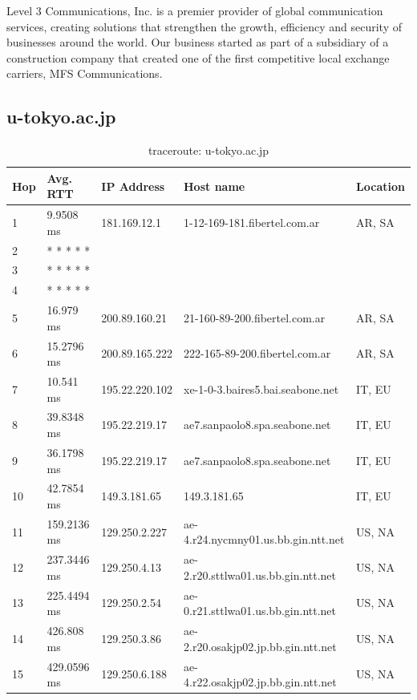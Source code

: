 \begin{tcolorbox}
Level 3 Communications, Inc. is a premier provider of global communication services, creating solutions that strengthen the growth, efficiency and security of businesses around the world. Our business started as part of a subsidiary of a construction company that created one of the first competitive local exchange carriers, MFS Communications.
\end{tcolorbox}

\subsection{u-tokyo.ac.jp}

\begin{table}[H]
\caption{traceroute: u-tokyo.ac.jp}
\centering
\begin{tabular}{@{}lllll@{}}
\toprule
Hop & Avg. RTT & IP Address & Host name & Location\\ \midrule
1 & 9.9508 ms & 181.169.12.1 & 1-12-169-181.fibertel.com.ar & AR, SA\\
2 &  * * * * * &  &  &  \\
3 &  * * * * * &  &  &  \\
4 &  * * * * * &  &  &  \\
5 & 16.979 ms & 200.89.160.21 & 21-160-89-200.fibertel.com.ar & AR, SA\\
6 & 15.2796 ms & 200.89.165.222 & 222-165-89-200.fibertel.com.ar & AR, SA\\
7 & 10.541 ms & 195.22.220.102 & xe-1-0-3.baires5.bai.seabone.net & IT, EU\\
8 & 39.8348 ms & 195.22.219.17 & ae7.sanpaolo8.spa.seabone.net & IT, EU\\
9 & 36.1798 ms & 195.22.219.17 & ae7.sanpaolo8.spa.seabone.net & IT, EU\\
10 & 42.7854 ms & 149.3.181.65 & 149.3.181.65 & IT, EU\\
11 & 159.2136 ms & 129.250.2.227 & ae-4.r24.nycmny01.us.bb.gin.ntt.net & US, NA\\
12 & 237.3446 ms & 129.250.4.13 & ae-2.r20.sttlwa01.us.bb.gin.ntt.net & US, NA\\
13 & 225.4494 ms & 129.250.2.54 & ae-0.r21.sttlwa01.us.bb.gin.ntt.net & US, NA\\
14 & 426.808 ms & 129.250.3.86 & ae-2.r20.osakjp02.jp.bb.gin.ntt.net & US, NA\\
15 & 429.0596 ms & 129.250.6.188 & ae-4.r22.osakjp02.jp.bb.gin.ntt.net & US, NA\\

\end{tabular}
\end{table}

